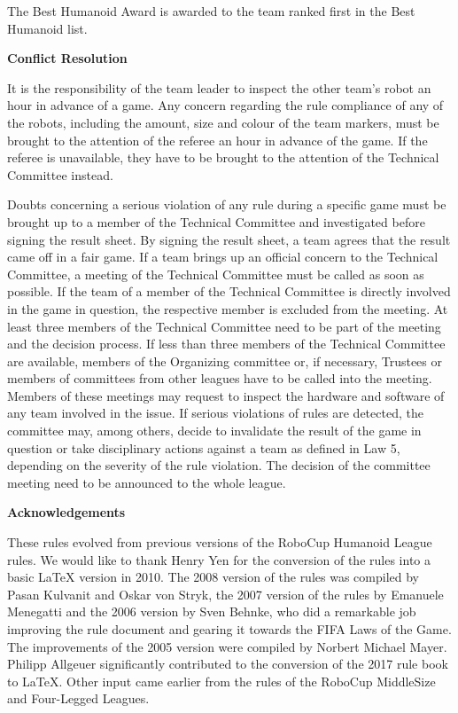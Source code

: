 The Best Humanoid Award is awarded to the team ranked first in the Best Humanoid list.

\bigskip

{\bfseries Conflict Resolution}

\headlinebox

It is the responsibility of the team leader to inspect the other team's robot an hour in advance of a game. Any concern regarding the rule compliance of any of the robots, including the amount, size and colour of the team markers, must be brought to the attention of the referee an hour in advance of the game. If the referee is unavailable, they have to be brought to the attention of the Technical Committee instead.

\bigskip

Doubts concerning a serious violation of any rule during a specific game must be brought up to a member of the Technical Committee and investigated before signing the result sheet. By signing the result sheet, a team agrees that the result came off in a fair game. If a team brings up an official concern to the Technical Committee, a meeting of the Technical Committee must be called as soon as possible. If the team of a member of the Technical Committee is directly involved in the game in question, the respective member is excluded from the meeting. At least three members of the Technical Committee need to be part of the meeting and the decision process. If less than three members of the Technical Committee are available, members of the Organizing committee or, if necessary, Trustees or members of committees from other leagues have to be called into the meeting. Members of these meetings may request to inspect the hardware and software of any team involved in the issue. If serious violations of rules are detected, the committee may, among others, decide to invalidate the result of the game in question or take disciplinary actions against a team as defined in Law 5, depending on the severity of the rule violation. The decision of the committee meeting need to be announced to the whole league.

{\bfseries Acknowledgements}

\headlinebox

These rules evolved from previous versions of the RoboCup Humanoid League rules. We would like to thank Henry Yen for the conversion of the rules into a basic LaTeX version in 2010. The 2008 version of the rules was compiled by Pasan Kulvanit and Oskar von Stryk, the 2007 version of the rules by Emanuele Menegatti and the 2006 version by Sven Behnke, who did a remarkable job improving the rule document and gearing it towards the FIFA Laws of the Game. The improvements of the 2005 version were compiled by Norbert Michael Mayer. Philipp Allgeuer significantly contributed to the conversion of the 2017 rule book to LaTeX.  Other input came earlier from the rules of the RoboCup MiddleSize and Four-Legged Leagues.

